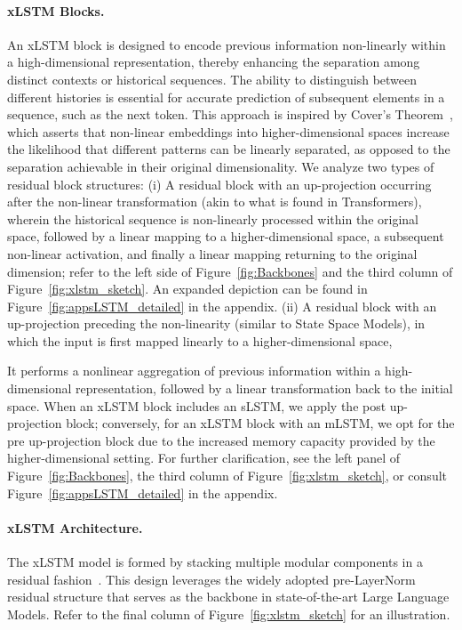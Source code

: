 \paragraph{xLSTM Blocks.}
\label{sec:xLSTMblock}
An xLSTM block is designed to encode previous information non-linearly within a high-dimensional representation, thereby enhancing the separation among distinct contexts or historical sequences. The ability to distinguish between different histories is essential for accurate prediction of subsequent elements in a sequence, such as the next token. This approach is inspired by Cover’s Theorem~\citep{Cover:65}, which asserts that non-linear embeddings into higher-dimensional spaces increase the likelihood that different patterns can be linearly separated, as opposed to the separation achievable in their original dimensionality. We analyze two types of residual block structures: (i) A residual block with an up-projection occurring after the non-linear transformation (akin to what is found in Transformers), wherein the historical sequence is non-linearly processed within the original space, followed by a linear mapping to a higher-dimensional space, a subsequent non-linear activation, and finally a linear mapping returning to the original dimension; refer to the left side of Figure~\ref{fig:Backbones} and the third column of Figure~\ref{fig:xlstm_sketch}. An expanded depiction can be found in Figure~\ref{fig:appsLSTM_detailed} in the appendix. (ii) A residual block with an up-projection preceding the non-linearity (similar to State Space Models), in which the input is first mapped linearly to a higher-dimensional space,

It performs a nonlinear aggregation of previous information within a high-dimensional representation, followed by a linear transformation back to the initial space. When an xLSTM block includes an sLSTM, we apply the post up-projection block; conversely, for an xLSTM block with an mLSTM, we opt for the pre up-projection block due to the increased memory capacity provided by the higher-dimensional setting. For further clarification, see the left panel of Figure~\ref{fig:Backbones}, the third column of Figure~\ref{fig:xlstm_sketch}, or consult Figure~\ref{fig:appsLSTM_detailed} in the appendix.

\paragraph{xLSTM Architecture. }
\label{sec:xLSTMarchitecure}
The xLSTM model is formed by stacking multiple modular components in a residual fashion~\citep{Srivastava:15,He:16}. This design leverages the widely adopted pre-LayerNorm~\citep{Ba:16b} residual structure that serves as the backbone in state-of-the-art Large Language Models. Refer to the final column of Figure~\ref{fig:xlstm_sketch} for an illustration.

